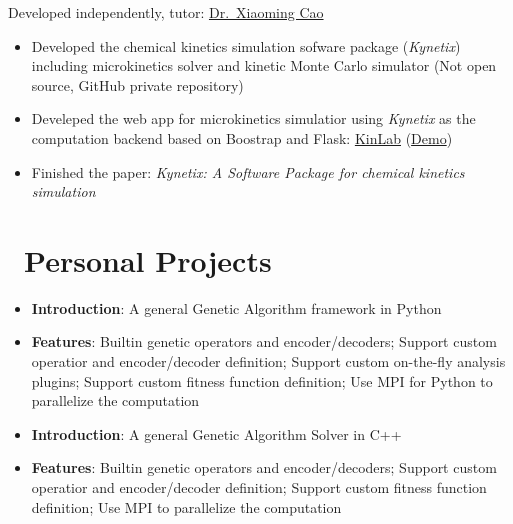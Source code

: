 \documentclass{resume}
\begin{document}
 {Developed independently, tutor: \faLink \href{http://chem.ecust.edu.cn/2014/1211/c6655a50467/page.htm}{Dr.\ Xiaoming Cao}}
\begin{onehalfspacing}
\begin{itemize}
    \item Developed the chemical kinetics simulation sofware package (\emph{Kynetix}) including microkinetics solver and kinetic Monte Carlo simulator (Not open source, GitHub private repository)
    \item Develeped the web app for microkinetics simulatior using \emph{Kynetix} as the computation backend based on Boostrap and Flask: \faLink \href{https://github.com/PytLab/KinLab}{KinLab} (\faLink \href{http://123.206.225.154:5000/}{Demo})
    \item Finished the paper: \emph{Kynetix: A Software Package for chemical kinetics simulation}
\end{itemize}
\end{onehalfspacing}

\section{\faUser\ Personal Projects}

\begin{onehalfspacing}
\begin{itemize}
    \item \textbf{Introduction}: A general Genetic Algorithm framework in Python
    \item \textbf{Features}: Builtin genetic operators and encoder/decoders; Support custom operatior and encoder/decoder definition; Support custom on-the-fly analysis plugins; Support custom fitness function definition; Use MPI for Python to parallelize the computation
\end{itemize}
\end{onehalfspacing}

\begin{onehalfspacing}
\begin{itemize}
    \item \textbf{Introduction}: A general Genetic Algorithm Solver in C++
    \item \textbf{Features}: Builtin genetic operators and encoder/decoders; Support custom operatior and encoder/decoder definition; Support custom fitness function definition; Use MPI to parallelize the computation
\end{itemize}
\end{onehalfspacing}
\end{document}
